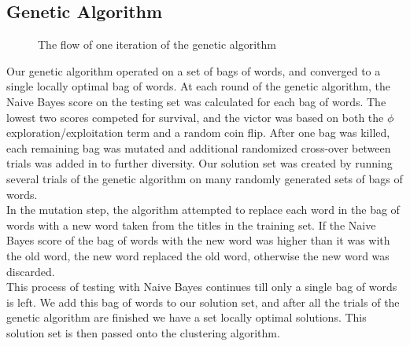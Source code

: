 \documentclass{sig-alternate}
\begin{document}
\subsection{Genetic Algorithm}
\begin{figure}[t]
\centering
{}
\caption{The flow of one iteration of the genetic algorithm}
\label{fig:genetic_algo}
\end{figure}
Our genetic algorithm operated on a set of bags of words, and converged to a single locally optimal bag of words. At each round of the genetic algorithm, the Naive Bayes score on the testing set was calculated for each bag of words. The lowest two scores competed for survival, and the victor was based on both the $\phi$ exploration/exploitation term and a random coin flip. After one bag was killed, each remaining bag was mutated and additional randomized cross-over between trials was added in to further diversity. Our solution set was created by running several trials of the genetic algorithm on many randomly generated sets of bags of words.\\
\indent In the mutation step, the algorithm attempted to replace each word in the bag of words with a new word taken from the titles in the training set. If the Naive Bayes score of the bag of words with the new word was higher than it was with the old word, the new word replaced the old word, otherwise the new word was discarded.\\
\indent This process of testing with Naive Bayes continues till only a single bag of words is left. We add this bag of words to our solution set, and after all the trials of the genetic algorithm are finished we have a set locally optimal solutions. This solution set is then passed onto the clustering algorithm.
\end{document}
